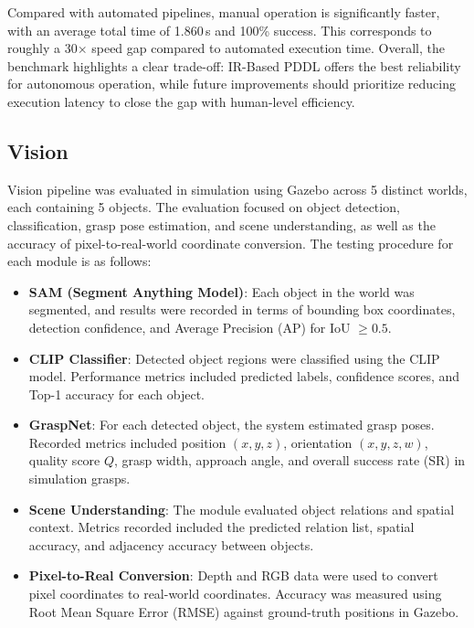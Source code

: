 \documentclass[12pt]{extarticle}
\begin{document}
Compared with automated pipelines, manual operation is significantly faster, with an average total time of 1.860\,s and 100\% success. This corresponds to roughly a 30$\times$ speed gap compared to automated execution time. Overall, the benchmark highlights a clear trade-off: IR-Based PDDL offers the best reliability for autonomous operation, while future improvements should prioritize reducing execution latency to close the gap with human-level efficiency.

\subsection{Vision}

Vision pipeline was evaluated in simulation using Gazebo across 5 distinct worlds, each containing 5 objects. The evaluation focused on object detection, classification, grasp pose estimation, and scene understanding, as well as the accuracy of pixel-to-real-world coordinate conversion. The testing procedure for each module is as follows:

\begin{itemize}
    \item \textbf{SAM (Segment Anything Model)}: Each object in the world was segmented, and results were recorded in terms of bounding box coordinates, detection confidence, and Average Precision (AP) for IoU $\geq 0.5$.
    
    \item \textbf{CLIP Classifier}: Detected object regions were classified using the CLIP model. Performance metrics included predicted labels, confidence scores, and Top-1 accuracy for each object.
    
    \item \textbf{GraspNet}: For each detected object, the system estimated grasp poses. Recorded metrics included position $(x, y, z)$, orientation $(x, y, z, w)$, quality score $Q$, grasp width, approach angle, and overall success rate (SR) in simulation grasps.
    
    \item \textbf{Scene Understanding}: The module evaluated object relations and spatial context. Metrics recorded included the predicted relation list, spatial accuracy, and adjacency accuracy between objects.
    
    \item \textbf{Pixel-to-Real Conversion}: Depth and RGB data were used to convert pixel coordinates to real-world coordinates. Accuracy was measured using Root Mean Square Error (RMSE) against ground-truth positions in Gazebo.
\end{itemize}
\end{document}
